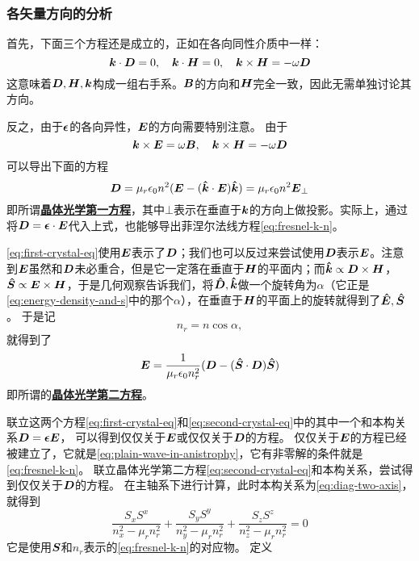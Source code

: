 \documentclass[UTF8, a4paper]{ctexart}
\newcommand*{\concept}[1]{\underline{\textbf{#1}}}
\begin{document}
\subsubsection{各矢量方向的分析}

首先，下面三个方程还是成立的，正如在各向同性介质中一样：
\[
    \vb*{k} \cdot \vb*{D} = 0, \quad \vb*{k} \cdot \vb*{H} = 0, \quad \vb*{k} \times \vb*{H} = - \omega \vb*{D}
\]
这意味着$\vb*{D}, \vb*{H}, \vb*{k}$构成一组右手系。$\vb*{B}$的方向和$\vb*{H}$完全一致，因此无需单独讨论其方向。

反之，由于$\vb*{\epsilon}$的各向异性，$\vb*{E}$的方向需要特别注意。
由于
\[
    \vb*{k} \times \vb*{E} = \omega \vb*{B}, \quad \vb*{k} \times \vb*{H} = - \omega \vb*{D}
\]
可以导出下面的方程
\begin{equation}
    \vb*{D} = \mu_r \epsilon_0 n^2 (\vb*{E} - (\vu*{k} \cdot \vb*{E}) \vu*{k}) = \mu_r \epsilon_0 n^2 \vb*{E}_{\bot}
    \label{eq:first-crystal-eq}
\end{equation}
即所谓\concept{晶体光学第一方程}，其中$\bot$表示在垂直于$\vb*{k}$的方向上做投影。实际上，通过将$\vb*{D} = \vb*{\epsilon} \cdot \vb*{E}$代入上式，也能够导出菲涅尔法线方程\eqref{eq:fresnel-k-n}。

\eqref{eq:first-crystal-eq}使用$\vb*{E}$表示了$\vb*{D}$；我们也可以反过来尝试使用$\vb*{D}$表示$\vb*{E}$。注意到$\vb*{E}$虽然和$\vb*{D}$未必重合，但是它一定落在垂直于$\vb*{H}$的平面内；而$\vu*{k} \propto \vb*{D} \times \vb*{H}$，$\vu*{S} \propto \vb*{E} \times \vb*{H}$，于是几何观察告诉我们，将$\vu*{D},\vu*{k}$做一个旋转角为$\alpha$（它正是\eqref{eq:energy-density-and-s}中的那个$\alpha$），在垂直于$\vb*{H}$的平面上的旋转就得到了$\vu*{E}, \vu*{S}$。
于是记
\begin{equation}
    n_r = n \cos \alpha,
\end{equation}
就得到了
\begin{equation}
    \vb*{E} = \frac{1}{\mu_r \epsilon_0 n_r^2} (\vb*{D} - (\vu*{S} \cdot \vb*{D}) \vu*{S})
    \label{eq:second-crystal-eq}
\end{equation}
即所谓的\concept{晶体光学第二方程}。

联立这两个方程\eqref{eq:first-crystal-eq}和\eqref{eq:second-crystal-eq}中的其中一个和本构关系$\vb*{D} = \vb*{\epsilon} \vb*{E}$，
可以得到仅仅关于$\vb*{E}$或仅仅关于$\vb*{D}$的方程。
仅仅关于$\vb*{E}$的方程已经被建立了，它就是\eqref{eq:plain-wave-in-anistrophy}，它有非零解的条件就是\eqref{eq:fresnel-k-n}。
联立晶体光学第二方程\eqref{eq:second-crystal-eq}和本构关系，尝试得到仅仅关于$\vb*{D}$的方程。
在主轴系下进行计算，此时本构关系为\eqref{eq:diag-two-axis}，
就得到
\begin{equation}
    \frac{S_x S^x}{n_x^2 - \mu_r n_r^2} + \frac{S_y S^y}{n_y^2 - \mu_r n_r^2} + \frac{S_z S^z}{n_z^2 - \mu_r n_r^2} = 0
\end{equation}
它是使用$\vb*{S}$和$n_r$表示的\eqref{eq:fresnel-k-n}的对应物。
定义
\end{document}
